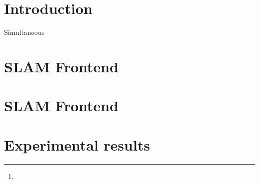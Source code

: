 \documentclass[english]{article}
\begin{document}
\title{}

\author{

\thanks{}
}
\date{November 2022}
\maketitle

\begin{abstract}

\end{abstract}

\section{\label{sec:Intro}Introduction}Simultaneous

\section{\label{sec:SLAM_fronted}SLAM Frontend}

\section{\label{sec:SLAM_fronted}SLAM Frontend}

\section{\label{sec:Exper_result}Experimental results}




\end{document}

